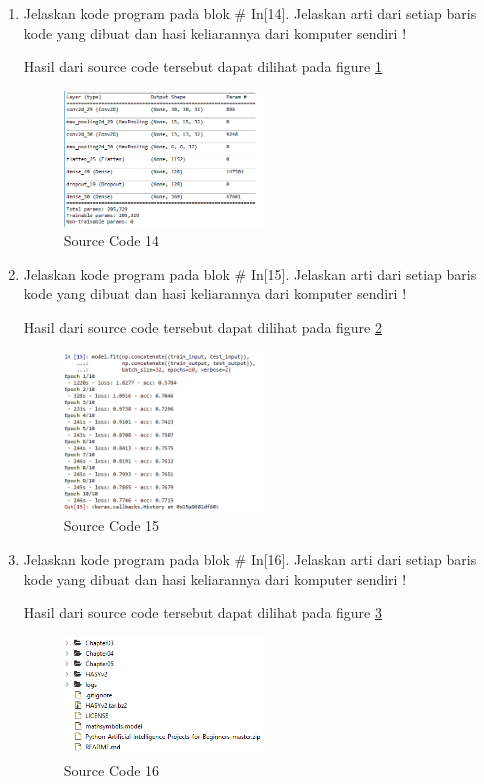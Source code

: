 \begin{enumerate}
\item Jelaskan kode program pada blok \# In[14]. Jelaskan arti dari setiap baris kode yang dibuat dan hasi keliarannya dari komputer sendiri !
	
	\subitem Hasil dari source code tersebut dapat dilihat pada figure \ref{YNC7-22}
	\begin{figure}[!htbp!]
		\centerline{\includegraphics[width=0.5\textwidth]{figures/YN/Chapter7/YNC7-22.png}}
		\caption{Source Code 14}
		\label{YNC7-22}
	\end{figure}

\item Jelaskan kode program pada blok \# In[15]. Jelaskan arti dari setiap baris kode yang dibuat dan hasi keliarannya dari komputer sendiri !
	
	\subitem Hasil dari source code tersebut dapat dilihat pada figure \ref{YNC7-23}
	\begin{figure}[!htbp!]
		\centerline{\includegraphics[width=0.5\textwidth]{figures/YN/Chapter7/YNC7-23.png}}
		\caption{Source Code 15}
		\label{YNC7-23}
	\end{figure}

\item Jelaskan kode program pada blok \# In[16]. Jelaskan arti dari setiap baris kode yang dibuat dan hasi keliarannya dari komputer sendiri !
	
	\subitem Hasil dari source code tersebut dapat dilihat pada figure \ref{YNC7-24}
	\begin{figure}[!htbp!]
		\centerline{\includegraphics[width=0.5\textwidth]{figures/YN/Chapter7/YNC7-24.png}}
		\caption{Source Code 16}
		\label{YNC7-24}
	\end{figure}


\end{enumerate}
